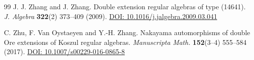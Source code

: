 \documentclass[reqno]{amsart}
\numberwithin{equation}{section}
\theoremstyle{definition}
\begin{document}
\begin{thebibliography}{99}
J. J. Zhang and J. Zhang. Double extension regular algebras of type (14641). {\em J. Algebra} {\bf 322}(2) 373--409 (2009). \href{https://doi.org/10.1016/j.jalgebra.2009.03.041}{DOI: 10.1016/j.jalgebra.2009.03.041}

C. Zhu, F. Van Oystaeyen and Y.-H. Zhang. Nakayama automorphisms of double Ore extensions of Koszul regular algebras. {\em Manuscripta Math.} {\bf 152}(3--4) 555--584 (2017). \href{https://doi.org/10.1007/s00229-016-0865-8}{DOI: 10.1007/s00229-016-0865-8}

\end{thebibliography}
\end{document}
